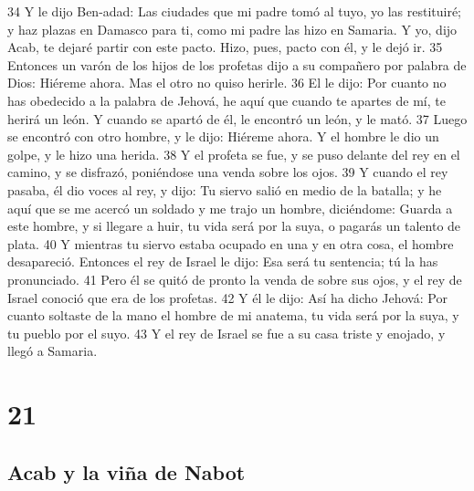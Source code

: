 34 Y le dijo Ben-adad: Las ciudades que mi padre tomó al tuyo, yo las restituiré; y haz plazas en Damasco para ti, como mi padre las hizo en Samaria. Y yo, dijo Acab, te dejaré partir con este pacto. Hizo, pues, pacto con él, y le dejó ir.
35 Entonces un varón de los hijos de los profetas dijo a su compañero por palabra de Dios: Hiéreme ahora. Mas el otro no quiso herirle.
36 El le dijo: Por cuanto no has obedecido a la palabra de Jehová, he aquí que cuando te apartes de mí, te herirá un león. Y cuando se apartó de él, le encontró un león, y le mató.
37 Luego se encontró con otro hombre, y le dijo: Hiéreme ahora. Y el hombre le dio un golpe, y le hizo una herida.
38 Y el profeta se fue, y se puso delante del rey en el camino, y se disfrazó, poniéndose una venda sobre los ojos.
39 Y cuando el rey pasaba, él dio voces al rey, y dijo: Tu siervo salió en medio de la batalla; y he aquí que se me acercó un soldado y me trajo un hombre, diciéndome: Guarda a este hombre, y si llegare a huir, tu vida será por la suya, o pagarás un talento de plata.
40 Y mientras tu siervo estaba ocupado en una y en otra cosa, el hombre desapareció. Entonces el rey de Israel le dijo: Esa será tu sentencia; tú la has pronunciado.
41 Pero él se quitó de pronto la venda de sobre sus ojos, y el rey de Israel conoció que era de los profetas.
42 Y él le dijo: Así ha dicho Jehová: Por cuanto soltaste de la mano el hombre de mi anatema, tu vida será por la suya, y tu pueblo por el suyo.
43 Y el rey de Israel se fue a su casa triste y enojado, y llegó a Samaria.

\chapter{21}

\section*{Acab y la viña de Nabot}


